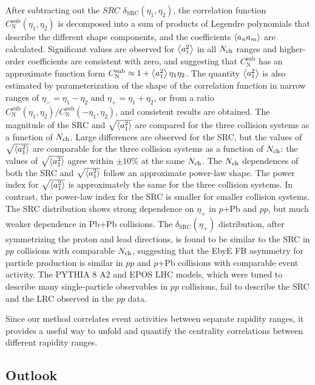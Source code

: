 After subtracting out the $SRC$ $\delta_\text{SRC}(\eta_1, \eta_2)$, the correlation function $C_\text{N}^\text{sub}(\eta_1, \eta_2)$ is decomposed into a sum of products of Legendre polynomials that describe the different shape components, and the coefficients $\left\langle a_n a_m\right\rangle$ are calculated. Significant values are observed for $\left\langle a_1^2\right\rangle$ in all $N_\text{ch}$ ranges and higher-order coefficients are consistent with zero, and suggesting that $C_\text{N}^\text{sub}$ has an approximate function form $C_\text{N}^\text{sub} \approx 1 + \left\langle a_1^2\right\rangle\eta_1\eta_2$. The quantity $\left\langle a_1^2\right\rangle$ is also estimated by parameterization of the shape of the correlation function in narrow ranges of $\eta_- = \eta_1 - \eta_2$ and $\eta_+ = \eta_1 + \eta_2$, or from a ratio $C_\text{N}^\text{sub}(\eta_1, \eta_2) / C_\text{N}^\text{sub}(-\eta_1, \eta_2)$, and consistent results are obtained. The magnitude of the SRC and $\sqrt{\left\langle a_1^2\right\rangle}$ are compared for the three collision systems as a function of $N_\text{ch}$. Large differences are observed for the SRC, but the values of $\sqrt{\left\langle a_1^2\right\rangle}$ are comparable for the three collision systems as a function of $N_\text{ch}$: the values of $\sqrt{\left\langle a_1^2\right\rangle}$ agree within $\pm 10\%$ at the same $N_\text{ch}$. The $N_\text{ch}$ dependences of both the SRC and $\sqrt{\left\langle a_1^2\right\rangle}$ follow an approximate power-law shape. The power index for $\sqrt{\left\langle a_1^2\right\rangle}$ is approximately the same for the three collision systems. In contrast, the power-law index for the SRC is smaller for smaller collision systems. The SRC distribution shows strong dependence on $\eta_+$ in $p$+Pb and $pp$, but much weaker dependence in Pb+Pb collisions. The $\delta_\text{SRC}(\eta_+)$ distribution, after symmetrizing the proton and lead directions, is found to be similar to the SRC in $pp$ collisions with comparable $N_\text{ch}$, suggesting that the EbyE FB asymmetry for particle production is similar in $pp$ and $p$+Pb collisions with comparable event activity. The PYTHIA 8 A2 and EPOS LHC models, which were tuned to describe many single-particle observables in $pp$ collisions, fail to describe the SRC and the LRC observed in the $pp$ data.

Since our method correlates event activities between separate rapidity ranges, it provides a useful way to unfold and quantify the centrality correlations between different rapidity ranges.




\subsection{Outlook}

